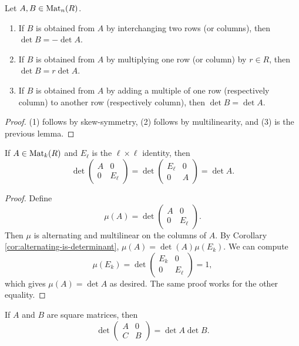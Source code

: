 \begin{prop}
  Let $A, B \in \operatorname{Mat}_n(R)$.
  \begin{enumerate}
    \item If $B$ is obtained from $A$ by interchanging
      two rows (or columns), then $\det B = -\det A$.
    \item If $B$ is obtained from $A$ by multiplying
      one row (or column) by $r \in R$, then
      $\det B = r \det A$.
    \item If $B$ is obtained from $A$ by adding a multiple
      of one row (respectively column) to another row
      (respectively column), then $\det B = \det A$.
  \end{enumerate}
\end{prop}

\begin{proof}
  (1) follows by skew-symmetry,
  (2) follows by multilinearity, and (3) is
  the previous lemma.
\end{proof}

\begin{lemma}
  If $A \in \operatorname{Mat}_k(R)$ and $E_\ell$ is the
  $\ell \times \ell$ identity, then
  \[
    \det
    \begin{pmatrix}
      A & 0 \\
      0 & E_\ell
    \end{pmatrix}
    =
    \det
    \begin{pmatrix}
      E_\ell & 0 \\
      0 & A
    \end{pmatrix}
    = \det A.
  \]
\end{lemma}

\begin{proof}
  Define
  \[
    \mu(A) = \det
    \begin{pmatrix}
      A & 0 \\
      0 & E_\ell
    \end{pmatrix}.
  \]
  Then $\mu$ is alternating and multilinear on the
  columns of $A$. By Corollary \ref{cor:alternating-is-determinant},
  $\mu(A) = \det(A) \mu(E_k)$. We can compute
  \[
    \mu(E_k) = \det
    \begin{pmatrix}
      E_k & 0 \\
      0 & E_\ell
    \end{pmatrix}
    = 1,
  \]
  which gives $\mu(A) = \det A$ as desired. The
  same proof works for the other equality.
\end{proof}

\begin{lemma}
  If $A$ and $B$ are square matrices, then
  \[
    \det
    \begin{pmatrix}
      A & 0 \\
      C & B
    \end{pmatrix}
    = \det A \det B.
  \]
\end{lemma}

